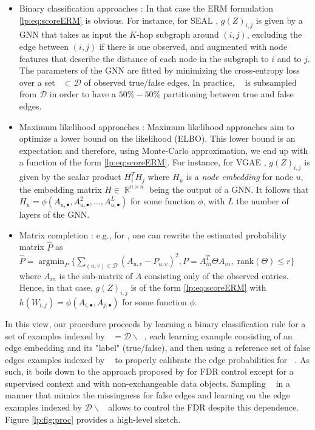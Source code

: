 \documentclass[a4paper, 11pt]{article}
\theoremstyle{remark}
\DeclareMathOperator{\argmin}{argmin}
\DeclareMathOperator{\R}{\mathbb{R}}
\DeclareMathOperator{\Dtr}{\cD_{\text{train}}}
\DeclareMathOperator{\Dcal}{\cD_{\text{cal}}}
\DeclareMathOperator{\Dtest}{\cD_{\text{test}}}
\newcommand{\EM}{\ensuremath}
\newcommand{\cD}{\EM{\mathcal{D}}}
\begin{document}
	\begin{itemize}
		\item Binary classification approaches \citep{zhang2018link, bleakley07}: In that case the ERM formulation \eqref{lp:eq:scoreERM} is obvious. For instance, for SEAL \citep{zhang2018link}, $g(Z)_{i,j}$  is given by a GNN that takes as input the $K$-hop subgraph around $(i,j)$, excluding the edge between $(i,j)$ if there is one observed, and augmented with node features that describe the distance of each node in the subgraph to $i$ and to $j$. The parameters of the GNN are fitted by minimizing the cross-entropy loss over a set $\Dtr \subset \cD$ of observed true/false edges. In practice, $\Dtr$ is subsampled from $\cD$ in order to have a $50\%-50\%$ partitioning between true and false edges. %
				
	\item Maximum likelihood approaches \citep{kipf2016variational, chiquet20}: Maximum likelihood approaches aim to optimize a lower bound on the likelihood (ELBO). This lower bound is an expectation and therefore, using Monte-Carlo approximation, we end up with a function of the form \eqref{lp:eq:scoreERM}. For instance, for VGAE \citep{kipf2016variational}, $g(Z)_{i,j}$ is given by the scalar product $H_i^T H_j$ where $H_u$ is a \textit{node embedding} for node $u$, the embedding matrix $H \in \R^{n \times n}$ being the output of a GNN. It follows that $H_u = \phi(A_{u, \bullet},  A^2_{u, \bullet}, \dots, A^L_{u, \bullet})$ for some function $\phi$, with $L$ the number of layers of the GNN. 

	\item Matrix completion \citep{levina23, gaucher21}: e.g., for \cite{levina23}, one can rewrite the estimated probability matrix $\hat P$ as $\hat P =  \argmin_{P} \{ \sum_{(u,v) \in \cD} (A_{u,v} - P_{u,v})^2, P = A_{in}^T\Theta A_{in}, \; \text{rank}(\Theta) \leq r\}$ where $A_{in}$ is the sub-matrix of $A$ consisting only of the observed entries. Hence, in that case, $g(Z)_{i,j}$ is of the form \eqref{lp:eq:scoreERM} with $h(W_{i,j})=\phi(A_{i, \bullet}, A_{j, \bullet})$ for some function $\phi$. 
	\end{itemize}
%	
In this view, our procedure proceeds by learning a binary classification rule for a set of examples indexed by $\Dtr = \cD \backslash \Dcal$, each learning example consisting of an edge embedding and its "label" (true/false), and then using a reference set of false edges examples indexed by $\Dcal$ to properly calibrate the edge probabilities for $\Dtest$. As such, it boils down to the approach proposed by \cite{bates2023testing} for FDR control except for a supervised context and with non-exchangeable data objects. Sampling $\Dcal$ in a manner that mimics the missingness for false edges and learning on the edge examples indexed by $\cD \backslash \Dcal$ allows to control the FDR despite this dependence. 
Figure \ref{lp:fig:proc} provides a high-level sketch.%
\end{document}
